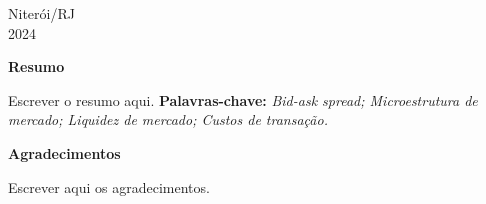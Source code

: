     \begin{center}
        Niterói/RJ\\[0.2cm]
        2024 
    \end{center}
    
    \newpage
    
    \begin{center}
        \textbf{\Large Resumo}\\[0.2cm]
    \end{center}
    
    
    
    \begin{flushleft}
        \setlength{\parskip}{1cm} %
        \linespread{1.5}\selectfont %
        \hspace*{0cm}\parbox{16.5cm}{
            Escrever o resumo aqui.
            \linespread{1.5}\selectfont
            \textbf{Palavras-chave:} \textit{Bid-ask spread; Microestrutura de mercado; Liquidez de mercado; Custos de transação.}
        }
    \end{flushleft}
    \newpage
    
    
    
    \begin{center}
        \textbf{\Large Agradecimentos}\\[0.2cm]
    \end{center}
    
    \begin{flushleft}
        \setlength{\parskip}{1cm} %
        \linespread{1.5}\selectfont %
        \hspace*{0cm}\parbox{16.5cm}{
            Escrever aqui os agradecimentos.
        }
    
    
    \end{flushleft}
    \newpage
    
    
    
    
    
    \thispagestyle{empty}
    
        
    